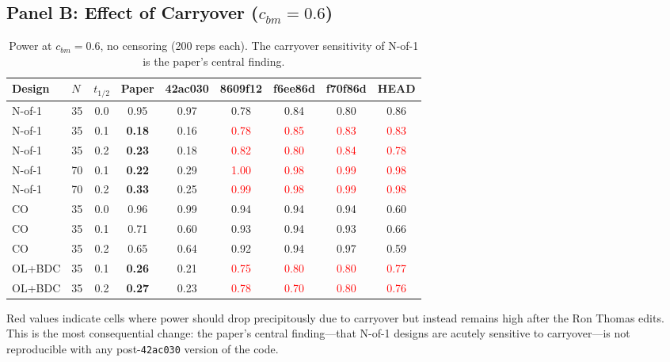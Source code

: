 \documentclass[11pt]{article}
\begin{document}
\subsection{Panel B: Effect of Carryover ($c_{bm} = 0.6$)}

\begin{table}[h]
\centering
\caption{Power at $c_{bm} = 0.6$, no censoring (200 reps each).
  The carryover sensitivity of N-of-1 is the paper's central
  finding.}
\small
\begin{tabular}{llccccccc}
\toprule
Design & $N$ & $t_{1/2}$ & Paper & 42ac030 & 8609f12 & f6ee86d
  & f70f86d & HEAD \\
\midrule
N-of-1 & 35 & 0.0 & 0.95 & 0.97 & 0.78 & 0.84 & 0.80 & 0.86 \\
N-of-1 & 35 & 0.1 & \textbf{0.18} & 0.16
  & \textcolor{red}{0.78} & \textcolor{red}{0.85}
  & \textcolor{red}{0.83} & \textcolor{red}{0.83} \\
N-of-1 & 35 & 0.2 & \textbf{0.23} & 0.18
  & \textcolor{red}{0.82} & \textcolor{red}{0.80}
  & \textcolor{red}{0.84} & \textcolor{red}{0.78} \\
N-of-1 & 70 & 0.1 & \textbf{0.22} & 0.29
  & \textcolor{red}{1.00} & \textcolor{red}{0.98}
  & \textcolor{red}{0.99} & \textcolor{red}{0.98} \\
N-of-1 & 70 & 0.2 & \textbf{0.33} & 0.25
  & \textcolor{red}{0.99} & \textcolor{red}{0.98}
  & \textcolor{red}{0.99} & \textcolor{red}{0.98} \\
\midrule
CO     & 35 & 0.0 & 0.96 & 0.99 & 0.94 & 0.94 & 0.94 & 0.60 \\
CO     & 35 & 0.1 & 0.71 & 0.60 & 0.93 & 0.94 & 0.93 & 0.66 \\
CO     & 35 & 0.2 & 0.65 & 0.64 & 0.92 & 0.94 & 0.97 & 0.59 \\
\midrule
OL+BDC & 35 & 0.1 & \textbf{0.26} & 0.21
  & \textcolor{red}{0.75} & \textcolor{red}{0.80}
  & \textcolor{red}{0.80} & \textcolor{red}{0.77} \\
OL+BDC & 35 & 0.2 & \textbf{0.27} & 0.23
  & \textcolor{red}{0.78} & \textcolor{red}{0.70}
  & \textcolor{red}{0.80} & \textcolor{red}{0.76} \\
\bottomrule
\end{tabular}
\label{tab:4b}
\end{table}

Red values indicate cells where power should drop precipitously
due to carryover but instead remains high after the Ron Thomas
edits. This is the most consequential change: the paper's central
finding---that N-of-1 designs are acutely sensitive to
carryover---is not reproducible with any post-\texttt{42ac030}
version of the code.
\end{document}
